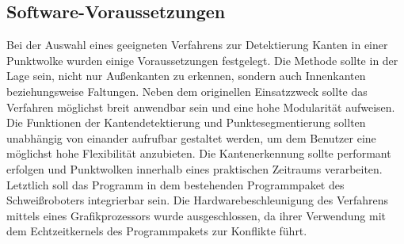 \subsection{Software-Voraussetzungen}\label{soft_voraus}
Bei der Auswahl eines geeigneten Verfahrens zur Detektierung Kanten in einer Punktwolke wurden einige Voraussetzungen festgelegt. Die Methode sollte in der Lage sein, nicht nur Außenkanten zu erkennen, sondern auch Innenkanten beziehungsweise Faltungen. Neben dem originellen Einsatzzweck sollte das Verfahren möglichst breit anwendbar sein und eine hohe Modularität aufweisen. Die Funktionen der Kantendetektierung und Punktesegmentierung sollten unabhängig von einander aufrufbar gestaltet werden, um dem Benutzer eine möglichst hohe Flexibilität anzubieten. Die Kantenerkennung sollte performant erfolgen und Punktwolken innerhalb eines praktischen Zeitraums verarbeiten. Letztlich soll das Programm in dem bestehenden Programmpaket des Schweißroboters integrierbar sein. Die Hardwarebeschleunigung des Verfahrens mittels eines Grafikprozessors wurde ausgeschlossen, da ihrer Verwendung mit dem Echtzeitkernels des Programmpakets zur Konflikte führt. 

